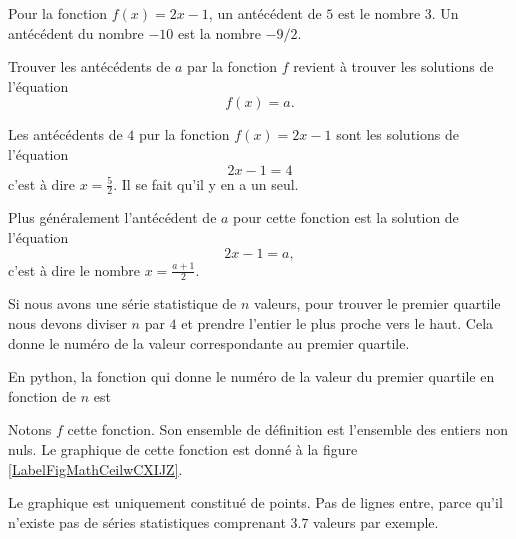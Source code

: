 \begin{example}
    Pour la fonction \( f(x)=2x-1\), un antécédent de \( 5\) est le nombre \( 3\). Un antécédent du nombre \( -10\) est la nombre \( -9/2\).
\end{example}

\begin{Aretenir}
    Trouver les antécédents de \( a\) par la fonction \( f\) revient à trouver les solutions de l'équation
    \begin{equation}
        f(x)=a.
    \end{equation}
\end{Aretenir}


\begin{example}

    Les antécédents de \( 4\) pur la fonction \( f(x)=2x-1\) sont les solutions de l'équation
    \begin{equation}
        2x-1=4
    \end{equation}
    c'est à dire \( x=\frac{ 5 }{2}\). Il se fait qu'il y en a un seul.

    Plus généralement l'antécédent de \( a\) pour cette fonction est la solution de l'équation
    \begin{equation}
        2x-1=a,
    \end{equation}
    c'est à dire le nombre \( x=\frac{ a+1 }{ 2 }\).
\end{example}

\begin{example} \label{EqlaIGDz}
    Si nous avons une série statistique de \( n\) valeurs, pour trouver le premier quartile nous devons diviser \( n\) par \( 4\) et prendre l'entier le plus proche vers le haut. Cela donne le numéro de la valeur correspondante au premier quartile.

    En python, la fonction qui donne le numéro de la valeur du premier quartile en fonction de \( n\) est
    \begin{quote}
    \end{quote}
    Notons \( f\) cette fonction. Son ensemble de définition est l'ensemble des entiers non nuls. Le graphique de cette fonction est donné à la figure \ref{LabelFigMathCeilwCXIJZ}.
\newcommand{\CaptionFigMathCeilwCXIJZ}{Le numéro de la valeur du premier quartile en fonction du nombre de valeurs.}


    Le graphique est uniquement constitué de points. Pas de lignes entre, parce qu'il n'existe pas de séries statistiques comprenant \( 3.7\) valeurs par exemple. 
\end{example}


